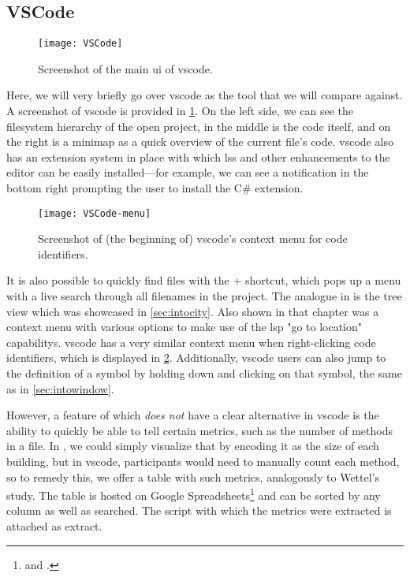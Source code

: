 \documentclass[../thesis]{subfiles}
\begin{document}
\subsection{VSCode}\label{subsec:vscode}

\begin{figure}[htbp]
	\begin{center}
		\texttt{[image: VSCode]}
	\end{center}
	\caption{Screenshot of the main \gls{ui} of \gls{vscode}.}\label{fig:vscode}
\end{figure}

Here, we will very briefly go over \gls{vscode} as the tool that we will compare \SEE{} against.
A screenshot of \gls{vscode} is provided in \cref{fig:vscode}.
On the left side, we can see the filesystem hierarchy of the open project, in the middle is the code itself, and on the right is a minimap as a quick overview of the current file's code.
\gls{vscode} also has an extension system in place with which \glspl{ls} and other enhancements to the editor can be easily installed---for example, we can see a notification in the bottom right prompting the user to install the C\# extension.

\begin{figure}[htbp]
	\begin{center}
		\texttt{[image: VSCode-menu]}
	\end{center}
	\caption{Screenshot of (the beginning of) \gls{vscode}'s context menu for code identifiers.}\label{fig:vscode_menu}
\end{figure}

It is also possible to quickly find files with the  +  shortcut, which pops up a menu with a live search through all filenames in the project.
The analogue in \SEE{} is the tree view which was showcased in \cref{sec:intocity}.
Also shown in that chapter was a context menu with various options to make use of the \gls{lsp} "go to location" \glspl{capability}.
\Gls{vscode} has a very similar context menu when right-clicking code identifiers, which is displayed in \cref{fig:vscode_menu}.
Additionally, \gls{vscode} users can also jump to the definition of a symbol by holding down  and clicking on that symbol, the same as in \cref{sec:intowindow}.

However, a feature of \SEE{} which \emph{does not} have a clear alternative in \gls{vscode} is the ability to quickly be able to tell certain metrics, such as the number of methods in a file.
In \SEE{}, we could simply visualize that by encoding it as the size of each building, but in \gls{vscode}, participants would need to manually count each method, so to remedy this, we offer a table with such metrics, analogously to Wettel's study.
The table is hosted on Google Spreadsheets\footnote{
	 and .
} and can be sorted by any column as well as searched.
The script with which the metrics were extracted is attached as \gls{extract}.
\end{document}
